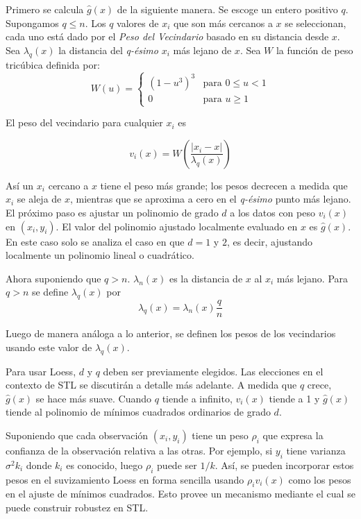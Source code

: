 \documentclass[12pt,oneside]{book}\usepackage[]{graphicx}\usepackage[]{color}
\theoremstyle{definition} %
\begin{document}
Primero se calcula $\hat{g}(x)$ de la siguiente manera. Se escoge un entero positivo $q$. Supongamos $q\leq n$. Los $q$ valores de $x_i$ que son más cercanos a $x$ se seleccionan, cada uno está dado por el \textit{Peso del Vecindario} basado en su  distancia desde $x$. Sea $\lambda_q(x)$ la distancia del \textit{q-ésimo} $x_i$ más lejano de $x$. Sea $W$ la función de peso tricúbica definida por:
\[
W(u)=
\left\{\begin{matrix}
(1-u^3)^3 & \text{para } 0\leq u < 1  \\ 
0 & \text{para } u\geq 1
\end{matrix}\right.
\] 

El peso del vecindario para cualquier $x_i$ es 

$$ v_i(x)=W \left( \frac{|x_i-x|}{\lambda_q(x)} \right) $$

Así un $x_i$ cercano a $x$ tiene el peso más grande; los pesos decrecen a medida que $x_i$ se aleja de $x$, mientras que se aproxima a cero en el \textit{q-ésimo} punto más lejano. El próximo paso es ajustar un polinomio de grado $d$ a los datos con peso $v_i(x)$ en $(x_i,y_i)$. El valor del polinomio ajustado localmente evaluado en $x$ es $\hat{g}(x)$. En este caso solo se analiza el caso en que $d=1$ y $2$, es decir, ajustando localmente un polinomio lineal o cuadrático.

Ahora suponiendo que $q>n$. $\lambda_n(x)$ es la distancia de $x$ al $x_i$ más lejano. Para $q>n$ se define $\lambda_q(x)$ por
$$\lambda_q(x)=\lambda_n(x)\frac{q}{n}$$

Luego de manera análoga a lo anterior, se definen los pesos de los vecindarios usando este valor de $\lambda_q(x)$.

Para usar Loess, $d$ y $q$ deben ser previamente elegidos. Las elecciones en el contexto de STL se discutirán a detalle más adelante. A medida que $q$ crece, $\hat{g}(x)$ se hace más suave. Cuando $q$ tiende a infinito, $v_i(x)$ tiende a 1 y $\hat{g}(x)$ tiende al polinomio de mínimos cuadrados ordinarios de grado $d$.

Suponiendo que cada observación $(x_i,y_i)$ tiene un peso $\rho_i$ que expresa la confianza de la observación relativa a las otras. Por ejemplo, si $y_i$ tiene varianza $\sigma^2k_i$ donde $k_i$ es conocido, luego $\rho_i$ puede ser $1/k$. Así, se pueden incorporar estos pesos en el suvizamiento Loess en forma sencilla usando $\rho_i v_i(x)$ como los pesos en el ajuste de mínimos cuadrados. Esto provee un mecanismo mediante el cual se puede construir robustez en STL.
\end{document}
